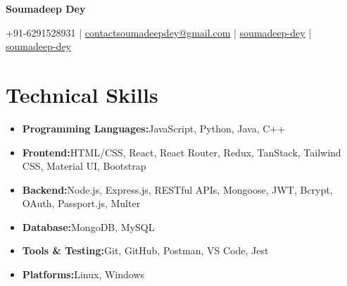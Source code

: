 \documentclass[a4paper,10pt]{article}
\newcommand{\resumeItem}[2]{
  \item{
    \textbf{#1}{\hspace{1mm}#2 \vspace{-0.5mm}}
  }
}
\newcommand{\resumeSubItem}[2]{\resumeItem{#1}{#2}\vspace{-4pt}}
\newcommand{\resumeHeadingSkillStart}{\begin{itemize}[leftmargin=*,itemsep=1.7mm, rightmargin=2ex]}
\newcommand{\resumeHeadingSkillEnd}{\end{itemize}\vspace{-2mm}}
\newcommand{\socialicon}[1]{\raisebox{-0.05em}{\resizebox{!}{1em}{#1}}}
\newcommand{\headerfontiii}{\fontfamily{ppl}\selectfont} %
\begin{document}
\headerfontiii

\begin{center}
    {\Huge\textbf{Soumadeep Dey}}
\end{center}
\vspace{-5mm}

\begin{center}
    \small{
    {\faMobile} +91-6291528931 | {\faEnvelope} \href{mailto:contactsoumadeepdey@gmail.com}{contactsoumadeepdey@gmail.com} | 
    \socialicon{\faLinkedin} \href{https://linkedin.com/in/soumadeep-dey}{soumadeep-dey} | 
    \socialicon{\faGithub} \href{https://github.com/soumadeep-dey}{soumadeep-dey} 
    }
\end{center}
\vspace{-4mm}


\section{\textbf{Technical Skills}}
\vspace{0.8mm}
 \resumeHeadingSkillStart
  \resumeSubItem{Programming Languages:}
    {JavaScript, Python, Java, C++}
  \resumeSubItem{Frontend:}
    {HTML/CSS, React, React Router, Redux, TanStack, Tailwind CSS, Material UI, Bootstrap}
  \resumeSubItem{Backend:}
   {Node.js, Express.js, RESTful APIs, Mongoose, JWT, Bcrypt, OAuth, Passport.js, Multer}
  \resumeSubItem{Database:}
    {MongoDB, MySQL}
  \resumeSubItem{Tools \& Testing:}
    {Git, GitHub, Postman, VS Code, Jest}
  \resumeSubItem{Platforms:}
    {Linux, Windows }
 \resumeHeadingSkillEnd
 \vspace{-2mm}
\end{document}
